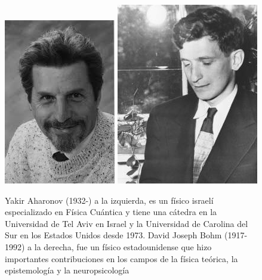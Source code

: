 \documentclass[12pt]{article}
\begin{document}
\begin{figure}
\centering
\includegraphics[scale=.6]{img/aharonov.jpg}
\includegraphics[scale=.7]{img/bohm.jpg}
\caption{Yakir Aharonov (1932-) a la izquierda,  es un físico israelí especializado en Física Cuántica y tiene una cátedra en la Universidad de Tel Aviv en Israel y la Universidad de Carolina del Sur en los Estados Unidos desde 1973. David Joseph Bohm (1917-1992) a la derecha, fue un físico estadounidense que hizo importantes contribuciones en los campos de la física teórica, la epistemología y la neuropsicología}
\end{figure}
\end{document}
